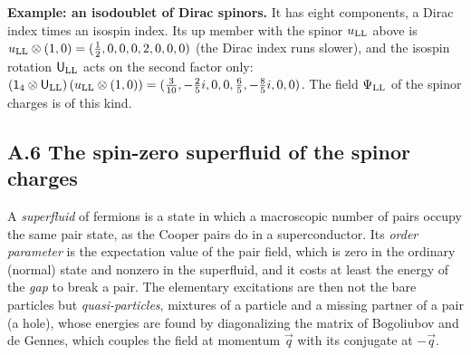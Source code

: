 \documentclass[
  10pt,
]{article}
\begin{document}
\textbf{Example: an isodoublet of Dirac spinors.} It has eight
components, a Dirac index times an isospin index. Its up member with the
spinor \(u_{\rm LL}\) above is
\(u_{\rm LL}\otimes(1,0)=(\tfrac{1}{2},0,0,0,2,0,0,0)\) (the Dirac index
runs slower), and the isospin rotation \(\mathsf U_{\rm LL}\) acts on
the second factor only:
\((\mathsf 1_4\otimes \mathsf U_{\rm LL})\,(u_{\rm LL}\otimes(1,0))=(\tfrac{3}{10},-\tfrac{2}{5}i,0,0,\tfrac{6}{5},-\tfrac{8}{5}i,0,0)\).
The field \(\Psi_{\rm LL}\) of the spinor charges is of this kind.

\hypertarget{a.6-the-spin-zero-superfluid-of-the-spinor-charges}{%
\subsection{A.6 The spin-zero superfluid of the spinor
charges}\label{a.6-the-spin-zero-superfluid-of-the-spinor-charges}}

A \emph{superfluid} of fermions is a state in which a macroscopic number
of pairs occupy the same pair state, as the Cooper pairs do in a
superconductor. Its \emph{order parameter} is the expectation value of
the pair field, which is zero in the ordinary (normal) state and nonzero
in the superfluid, and it costs at least the energy of the \emph{gap} to
break a pair. The elementary excitations are then not the bare particles
but \emph{quasi-particles}, mixtures of a particle and a missing partner
of a pair (a hole), whose energies are found by diagonalizing the matrix
of Bogoliubov and de Gennes, which couples the field at momentum
\(\vec q\) with its conjugate at \(-\vec q\).
\end{document}
